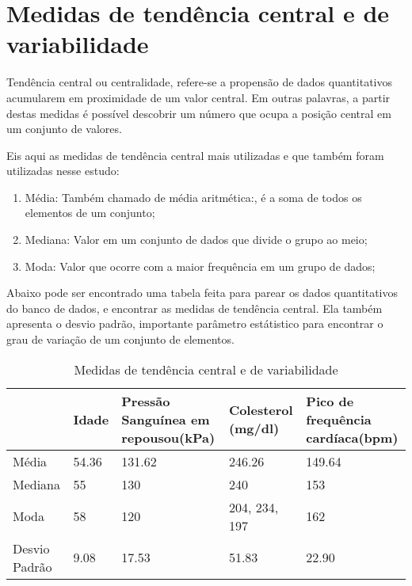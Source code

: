 \chapter{Medidas de tendência central e de variabilidade}

    Tendência central ou centralidade, refere-se a propensão de dados quantitativos acumularem
    em proximidade de um valor central. Em outras palavras, a partir destas medidas é possível 
    descobrir um número que ocupa a posição central em um conjunto de valores.

    Eis aqui as medidas de tendência central mais utilizadas e que também foram utilizadas nesse 
    estudo:

    \begin{enumerate}[label={\alph*)}]
      \addtolength{\itemindent}{1.25cm}
      \item Média: Também chamado de média aritmética:, é a soma de todos os elementos de um conjunto;
      \item Mediana: Valor em um conjunto de dados que divide o grupo ao meio;
      \item Moda: Valor que ocorre com a maior frequência em um grupo de dados;
    \end{enumerate}

    Abaixo pode ser encontrado uma tabela feita para parear os dados quantitativos do banco de dados, 
    e encontrar as medidas de tendência central. Ela também apresenta o desvio padrão, importante 
    parâmetro estátistico para encontrar o grau de variação de um conjunto de elementos.

    \begin{table}[htb]
      \caption{Medidas de tendência central e de variabilidade}
      \centering
        \begin{tabular}{ |P{2.8cm} |P{2cm}|P{3cm}|P{3cm}|P{3cm}|  }
          \hline
            & Idade & Pressão Sanguínea em repousou(kPa) & Colesterol  (mg/dl) & Pico de frequência cardíaca(bpm)\\
          \hline
          Média & 54.36 & 131.62 & 246.26 & 149.64 \\
          \hline
          Mediana & 55 & 130 & 240 & 153 \\
          \hline
          Moda & 58 & 120 & 204, 234, 197 & 162 \\
          \hline
          Desvio Padrão & 9.08 & 17.53 & 51.83 & 22.90 \\
          \hline
        \end{tabular}
    \end{table}

